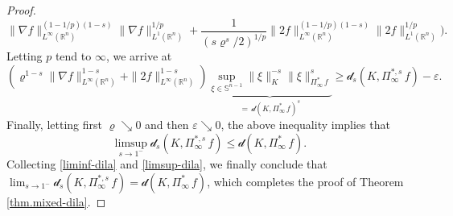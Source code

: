\documentclass[11pt, reqno]{article}
\theoremstyle{definition}
\numberwithin{equation}{section}
\newtheorem{remark}[theorem]{Remark}
\newcommand{\R}{\mathbb{R}}
\newcommand{\Sphere}{\mathbb{S}^{n - 1}}
\newcommand{\dila}{\mathscr{d}}
\begin{document}
\begin{proof}
\[			\| \nabla f \|^{\left(1 - 1/p \right)(1 - s)}_{L^\infty(\R^n)} \| \nabla f \|_{L^1(\R^n)}^{1/p} 
		+
		\dfrac{1}{(s \varrho^s/2)^{1/p} } \| 2f \|^{\left(1 - 1/p\right)(1 - s)}_{L^\infty(\R^n)} \| 2f \|_{L^1(\R^n)}^{1/p}
		\Bigg).
	\]
Letting $p$ tend to $\infty$, we arrive at
	\begin{equation}
		\left( \varrho^{1 - s} \| \nabla f \|_{L^{\infty}(\R^n)}^{1 - s} + \| 2f \|_{L^{\infty}(\R^n)}^{1 - s} \right)
		\underbrace{\sup_{\xi \in \Sphere} \| \xi \|_K^{-s} \| \xi \|_{\Pi^\ast_\infty \, f}^s}_{= \, \dila(K, \Pi^{\ast}_\infty \, f)^s} 
		\geq 
		\dila_s(K, \Pi^{\ast, s}_\infty  \, f) - \varepsilon.
	\end{equation}
Finally, letting first $\varrho \searrow 0$ and then $\varepsilon \searrow 0$, the above inequality implies that
	\begin{equation}\label{limsup-dila}
		\limsup_{s \to 1^-} \dila_s(K, \Pi^{\ast, s}_\infty  \, f) 
		\leq 
		\dila(K, \Pi^{\ast}_\infty \, f).
	\end{equation}
Collecting \eqref{liminf-dila} and \eqref{limsup-dila}, we finally conclude that $\textstyle\lim_{s \to 1^-} \dila_s(K, \Pi^{\ast, s}_\infty  \, f)  = \dila(K, \Pi^{\ast}_\infty \, f)$, which completes the proof of Theorem \ref{thm.mixed-dila}.
\end{proof}





\end{document}
